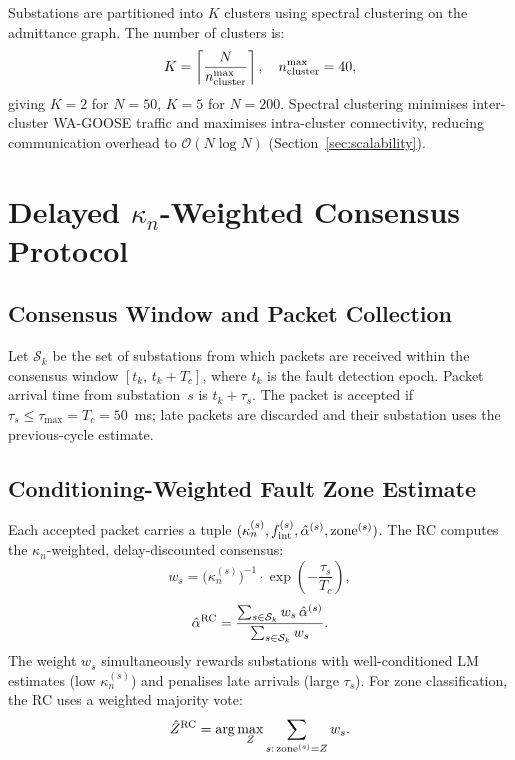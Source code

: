 \documentclass[journal]{IEEEtran}
\newcommand{\kappan}{\kappa_n}
\newcommand{\Tc}{T_c}
\newcommand{\taumax}{\tau_{\max}}
\begin{document}
Substations are partitioned into $K$ clusters using spectral clustering
on the admittance graph.  The number of clusters is:
\begin{equation}
  K = \left\lceil \frac{N}{n_{\rm cluster}^{\rm max}} \right\rceil,
  \quad n_{\rm cluster}^{\rm max} = 40,
  \label{eq:clusters}
\end{equation}
giving $K = 2$ for $N = 50$, $K = 5$ for $N = 200$.
Spectral clustering minimises inter-cluster WA-GOOSE traffic and
maximises intra-cluster connectivity, reducing communication overhead
to $\mathcal{O}(N \log N)$ (Section~\ref{sec:scalability}).

\section{Delayed $\kappan$-Weighted Consensus Protocol}
\label{sec:protocol}

\subsection{Consensus Window and Packet Collection}

Let $\mathcal{S}_k$ be the set of substations from which packets are
received within the consensus window $[t_k,\, t_k + \Tc]$, where
$t_k$ is the fault detection epoch.  Packet arrival time from
substation~$s$ is $t_k + \tau_s$.  The packet is accepted if
$\tau_s \leq \taumax = \Tc = 50$~ms; late packets are discarded
and their substation uses the previous-cycle estimate.

\subsection{Conditioning-Weighted Fault Zone Estimate}

Each accepted packet carries a tuple $(\kappan^{(s)}, f_{\rm int}^{(s)},
\hat{\alpha}^{(s)}, \text{zone}^{(s)})$.  The RC computes the
$\kappan$-weighted, delay-discounted consensus:
\begin{equation}
  w_s = \bigl(\kappan^{(s)}\bigr)^{-1}
    \cdot \exp\!\left(-\frac{\tau_s}{\Tc}\right),
  \label{eq:weight}
\end{equation}
\begin{equation}
  \hat{\alpha}^{\rm RC} = \frac{\sum_{s \in \mathcal{S}_k} w_s\,\hat{\alpha}^{(s)}}
                               {\sum_{s \in \mathcal{S}_k} w_s}.
  \label{eq:alpha_rc}
\end{equation}
The weight $w_s$ simultaneously rewards substations with
well-conditioned LM estimates (low $\kappan^{(s)}$) and penalises
late arrivals (large $\tau_s$).  For zone classification, the RC
uses a weighted majority vote:
\begin{equation}
  \hat{Z}^{\rm RC} = \arg\max_{Z} \sum_{s:\,{\rm zone}^{(s)}=Z} w_s.
  \label{eq:zone_vote}
\end{equation}
\end{document}
